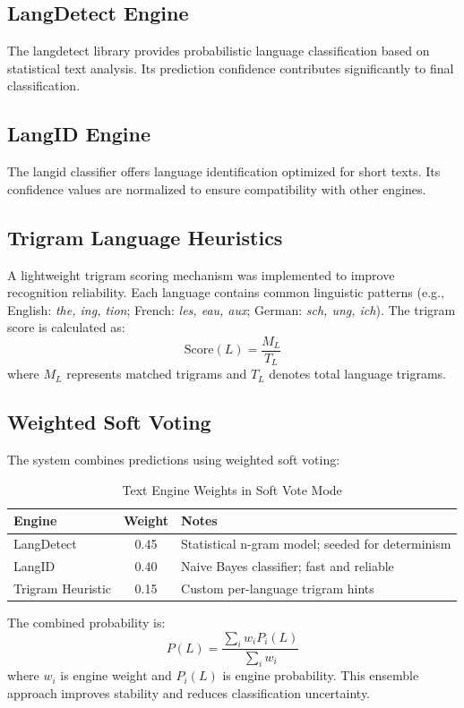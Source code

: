 \documentclass[12pt]{report}
\begin{document}
\subsection{LangDetect Engine}
The langdetect library provides probabilistic language classification based on statistical text analysis. Its prediction confidence contributes significantly to final classification.

\subsection{LangID Engine}
The langid classifier offers language identification optimized for short texts. Its confidence values are normalized to ensure compatibility with other engines.

\subsection{Trigram Language Heuristics}
A lightweight trigram scoring mechanism was implemented to improve recognition reliability. Each language contains common linguistic patterns (e.g., English: \textit{the, ing, tion}; French: \textit{les, eau, aux}; German: \textit{sch, ung, ich}). The trigram score is calculated as:
\[
\text{Score}(L) = \frac{M_L}{T_L}
\]
where $M_L$ represents matched trigrams and $T_L$ denotes total language trigrams.

\subsection{Weighted Soft Voting}

The system combines predictions using weighted soft voting:

\begin{table}[H]
\centering
\begin{tabular}{|l|c|p{7cm}|}
\hline
\textbf{Engine} & \textbf{Weight} & \textbf{Notes} \\
\hline
LangDetect & 0.45 & Statistical n-gram model; seeded for determinism \\
\hline
LangID & 0.40 & Naive Bayes classifier; fast and reliable \\
\hline
Trigram Heuristic & 0.15 & Custom per-language trigram hints \\
\hline
\end{tabular}
\caption{Text Engine Weights in Soft Vote Mode}
\end{table}

The combined probability is:
\[
P(L) = \frac{\sum_i w_i P_i(L)}{\sum_i w_i}
\]
where $w_i$ is engine weight and $P_i(L)$ is engine probability. This ensemble approach improves stability and reduces classification uncertainty.
\end{document}
